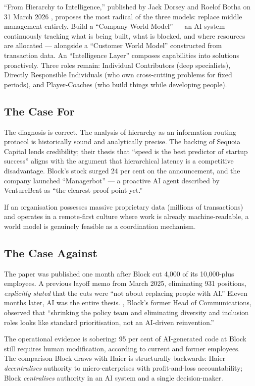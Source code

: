 ``From Hierarchy to Intelligence,'' published by Jack Dorsey and Roelof Botha on 31 March 2026 \parencite{DorseyBotha2026}, proposes the most radical of the three models: replace middle management entirely. Build a ``Company World Model'' --- an AI system continuously tracking what is being built, what is blocked, and where resources are allocated --- alongside a ``Customer World Model'' constructed from transaction data. An ``Intelligence Layer'' composes capabilities into solutions proactively. Three roles remain: Individual Contributors (deep specialists), Directly Responsible Individuals (who own cross-cutting problems for fixed periods), and Player-Coaches (who build things while developing people).

\subsection{The Case For}

The diagnosis is correct. The analysis of hierarchy as an information routing protocol is historically sound and analytically precise. The backing of Sequoia Capital lends credibility; their thesis that ``speed is the best predictor of startup success'' aligns with the argument that hierarchical latency is a competitive disadvantage. Block's stock surged 24 per cent on the announcement, and the company launched ``Managerbot'' --- a proactive AI agent described by VentureBeat as ``the clearest proof point yet.''

If an organisation possesses massive proprietary data (millions of transactions) and operates in a remote-first culture where work is already machine-readable, a world model is genuinely feasible as a coordination mechanism.

\subsection{The Case Against}

The paper was published one month after Block cut 4,000 of its 10,000-plus employees. A previous layoff memo from March 2025, eliminating 931 positions, \emph{explicitly stated} that the cuts were ``not about replacing people with AI.'' Eleven months later, AI was the entire thesis. \textcite{Zamost2026}, Block's former Head of Communications, observed that ``shrinking the policy team and eliminating diversity and inclusion roles looks like standard prioritisation, not an AI-driven reinvention.''

The operational evidence is sobering: 95 per cent of AI-generated code at Block still requires human modification, according to current and former employees. The comparison Block draws with Haier is structurally backwards: Haier \emph{decentralises} authority to micro-enterprises with profit-and-loss accountability; Block \emph{centralises} authority in an AI system and a single decision-maker.

